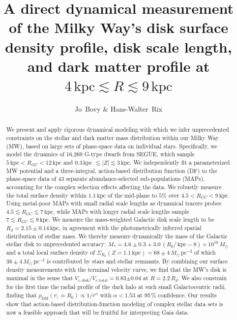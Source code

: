 \documentclass{emulateapj}
\newcounter{address}
\newcommand{\map}{MAP}
\newcommand{\kpc}{\ensuremath{\,\mathrm{kpc}}}
\newcommand{\pc}{\ensuremath{\,\mathrm{pc}}}
\begin{document}
\title{A direct dynamical measurement of the Milky Way's disk surface
  density profile, disk scale length, and dark matter profile at
  $4\kpc \lesssim R \lesssim 9\kpc$}
\author{Jo~Bovy \&
  Hans-Walter~Rix}

\begin{abstract} 
 We present and apply rigorous dynamical modeling with which we infer
 unprecedented constraints on the stellar and dark matter mass
 distribution within our Milky Way (MW), based on large sets of
 phase-space data on individual stars.  Specifically, we model the
 dynamics of 16,269 G-type dwarfs from SEGUE, which sample $5\kpc <
 R_{GC} < 12\kpc$ and $0.3\kpc$ $\lesssim |Z| \lesssim 3\kpc$. We
 independently fit a parameterized MW potential and a three-integral,
 action-based distribution function (DF) to the phase-space data of 43
 separate abundance-selected sub-populations (\map s), accounting for
 the complex selection effects affecting the data.  We robustly
 measure the total surface density within $1.1\kpc$ of the mid-plane
 to $5\%$ over $4.5 < R_{GC} < 9\kpc$. Using metal-poor \map s with
 small radial scale lengths as dynamical tracers probes $4.5 \lesssim
 R_{GC} \lesssim 7\kpc$, while \map s with longer radial scale lengths
 sample $7 \lesssim R_{GC} \lesssim 9\kpc$.  We measure the
 mass-weighted Galactic disk scale length to be $R_d =
 2.15\pm0.14\kpc$, in agreement with the photometrically inferred
 spatial distribution of stellar mass.  We thereby measure dynamically
 the mass of the Galactic stellar disk to unprecedented accuracy: $M_*
 = 4.6\pm0.3+3.0\,(R_0/\kpc-8)\times10^{10}\,M_\odot$ and a total
 local surface density of $\Sigma_{R_0}(Z=1.1\kpc) =
 68\pm4\,M_\odot\pc^{-2}$ of which $38\pm4\,M_\odot\pc^{-2}$ is
 contributed by stars and stellar remnants. By combining our surface
 density measurements with the terminal velocity curve, we find that
 the MW's disk is maximal in the sense that $V_{c,\mathrm{disk}} /
 V_{c,\mathrm{total}} = 0.83$$\pm$$0.04$ at $R=2.2\,R_d$.  We also
 constrain for the first time the radial profile of the dark halo at
 such small Galactocentric radii, finding that $\rho_{\mathrm{DM}}
 (r;\approx R_0) \propto 1 / r^{\alpha}$ with $\alpha < 1.53$ at
 95\,\% confidence. Our results show that action-based
 distribution-function modeling of complex stellar data sets is now a
 feasible approach that will be fruitful for interpreting Gaia data.
\end{abstract}
\end{document}
